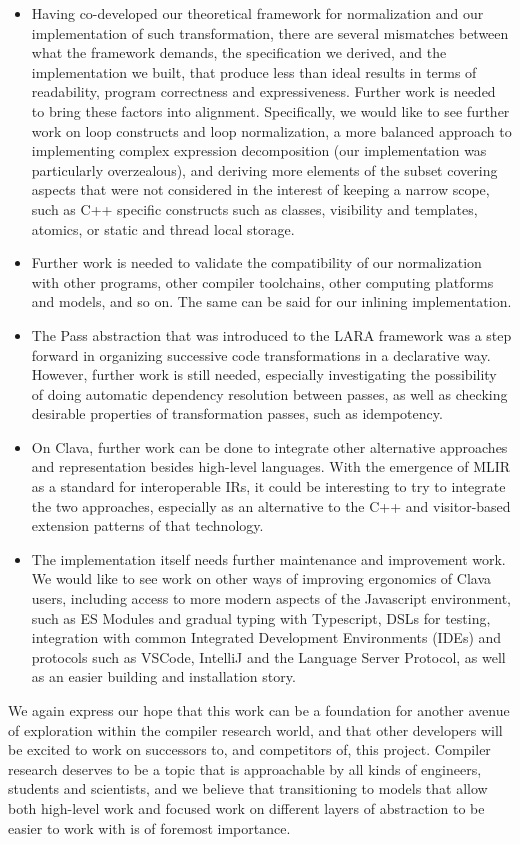 \begin{itemize}
    \item Having co-developed our theoretical framework for normalization and our implementation of such transformation, there are several mismatches between what the framework demands, the specification we derived, and the implementation we built, that produce less than ideal results in terms of readability, program correctness and expressiveness. Further work is needed to bring these factors into alignment. Specifically, we would like to see further work on loop constructs and loop normalization, a more balanced approach to implementing complex expression decomposition (our implementation was particularly overzealous), and deriving more elements of the subset covering aspects that were not considered in the interest of keeping a narrow scope, such as C++ specific constructs such as classes, visibility and templates, atomics, or static and thread local storage.
    \item Further work is needed to validate the compatibility of our normalization with other programs, other compiler toolchains, other computing platforms and models, and so on. The same can be said for our inlining implementation.
    \item The Pass abstraction that was introduced to the LARA framework was a step forward in organizing successive code transformations in a declarative way. However, further work is still needed, especially investigating the possibility of doing automatic dependency resolution between passes, as well as checking desirable properties of transformation passes, such as idempotency.
    \item On Clava, further work can be done to integrate other alternative approaches and representation besides high-level languages. With the emergence of MLIR as a standard for interoperable IRs, it could be interesting to try to integrate the two approaches, especially as an alternative to the C++ and visitor-based extension patterns of that technology.
    \item The implementation itself needs further maintenance and improvement work. We would like to see work on other ways of improving ergonomics of Clava users, including access to more modern aspects of the Javascript environment, such as ES Modules and gradual typing with Typescript, DSLs for testing, integration with common Integrated Development Environments (IDEs) and protocols such as VSCode, IntelliJ and the Language Server Protocol, as well as an easier building and installation story. 
\end{itemize}

We again express our hope that this work can be a foundation for another avenue of exploration within the compiler research world, and that other developers will be excited to work on successors to, and competitors of, this project. Compiler research deserves to be a topic that is approachable by all kinds of engineers, students and scientists, and we believe that transitioning to models that allow both high-level work and focused work on different layers of abstraction to be easier to work with is of foremost importance.